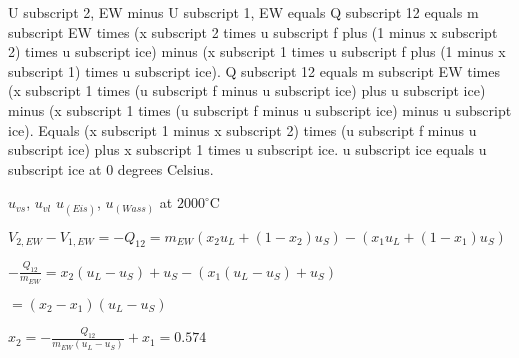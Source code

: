 U subscript 2, EW minus U subscript 1, EW equals Q subscript 12 equals m subscript EW times (x subscript 2 times u subscript f plus (1 minus x subscript 2) times u subscript ice) minus (x subscript 1 times u subscript f plus (1 minus x subscript 1) times u subscript ice).  
Q subscript 12 equals m subscript EW times (x subscript 1 times (u subscript f minus u subscript ice) plus u subscript ice) minus (x subscript 1 times (u subscript f minus u subscript ice) minus u subscript ice).  
Equals (x subscript 1 minus x subscript 2) times (u subscript f minus u subscript ice) plus x subscript 1 times u subscript ice.  
u subscript ice equals u subscript ice at 0 degrees Celsius.

\( u_{vs} \), \( u_{vl} \)  
\( u_{(Eis)} \), \( u_{(Wass)} \) at \( 2000^\circ \text{C} \)  

\( V_{2,EW} - V_{1,EW} = -Q_{12} = m_{EW} \left( x_2 u_L + (1 - x_2) u_S \right) - \left( x_1 u_L + (1 - x_1) u_S \right) \)  

\( -\frac{Q_{12}}{m_{EW}} = x_2 (u_L - u_S) + u_S - \left( x_1 (u_L - u_S) + u_S \right) \)  

\( = (x_2 - x_1) (u_L - u_S) \)  

\( x_2 = -\frac{Q_{12}}{m_{EW} (u_L - u_S)} + x_1 = 0.574 \)